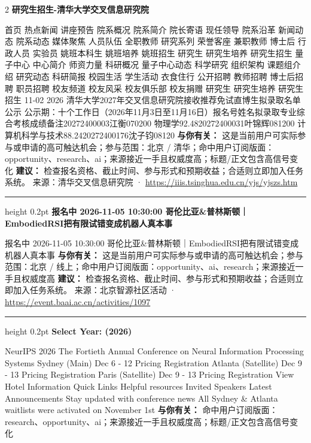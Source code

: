 \documentclass[10.5pt]{ctexart}
\begin{document}
\begin{multicols}{2}
{\large\bfseries 研究生招生-清华大学交叉信息研究院}\par
首页 热点新闻 讲座预告 院系概况 院系简介 院长寄语 现任领导 院系沿革 新闻动态 院系动态 媒体聚焦 人员队伍 全职教师 研究系列 荣誉客座 兼职教师 博士后 行政人员 实验员 姚班本科生 姚班培养 姚班招生 研究生 研究生培养 研究生招生 量子中心 中心简介 师资力量 科研概况 量子中心动态 科学研究 组织架构 课题组介绍 研究动态 科研简报 校园生活 学生活动 衣食住行 公开招聘 教师招聘 博士后招聘 职员招聘 校友频道 校友风采 校友俱乐部 校友捐赠 研究生 研究生培养 研究生招生 11-02 2026 清华大学2027年交叉信息研究院接收推荐免试直博生拟录取名单公示 公示期：十个工作日（2026年11月3日至11月16日）报名号姓名拟录取专业综合考核成绩备注20272400003江衡070200 物理学92.4820272400031叶锦辉081200 计算机科学与技术88.2420272400176沈子钧08120
\textbf{与你有关：} 这是当前用户可实际参与或申请的高可触达机会；参与范围：北京 / 清华；命中用户订阅版面：opportunity、research、ai；来源接近一手且权威度高；标题/正文包含高信号变化
\textbf{建议：} 检查报名资格、截止时间、参与形式和预期收益；合适则立即加入任务系统。
{\footnotesize\color{ormuted} 来源：清华交叉信息研究院 · \url{https://iiis.tsinghua.edu.cn/yjs/yjszs.htm}}
\vspace{2mm}
\hrule height 0.2pt
\vspace{2mm}
{\large\bfseries 报名中 2026-11-05 10:30:00 哥伦比亚\&普林斯顿｜EmbodiedRSI把有限试错变成机器人真本事}\par
报名中 2026-11-05 10:30:00 哥伦比亚\&普林斯顿｜EmbodiedRSI把有限试错变成机器人真本事
\textbf{与你有关：} 这是当前用户可实际参与或申请的高可触达机会；参与范围：北京 / 线上；命中用户订阅版面：opportunity、ai、research；来源接近一手且权威度高
\textbf{建议：} 检查报名资格、截止时间、参与形式和预期收益；合适则立即加入任务系统。
{\footnotesize\color{ormuted} 来源：北京智源社区活动 · \url{https://event.baai.ac.cn/activities/1097}}
\vspace{2mm}
\hrule height 0.2pt
\vspace{2mm}
{\large\bfseries Select Year: (2026)}\par
NeurIPS 2026 The Fortieth Annual Conference on Neural Information Processing Systems Sydney (Main) Dec 6 - 12 Pricing Registration Atlanta (Satellite) Dec 9 - 13 Pricing Registration Paris (Satellite) Dec 9 - 13 Pricing Registration View Hotel Information Quick Links Helpful resources Invited Speakers Latest Announcements Stay updated with conference news All Sydney \& Atlanta waitlists were activated on November 1st 
\textbf{与你有关：} 命中用户订阅版面：research、opportunity、ai；来源接近一手且权威度高；标题/正文包含高信号变化

\end{multicols}
\end{document}
